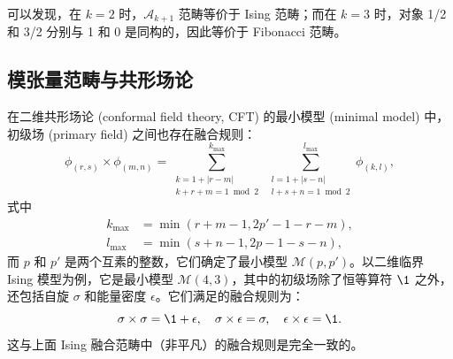 可以发现，在 $k=2$ 时，$\mathcal{A}_{k+1}$ 范畴等价于 Ising 范畴；而在 $k=3$ 时，对象 {1/2 和 3/2} 分别与 1 和 0 是同构的，因此等价于 Fibonacci 范畴。

\subsection{模张量范畴与共形场论}

在二维共形场论 (conformal field theory, CFT) 的最小模型 (minimal model) 中，初级场 (primary field) 之间也存在融合规则\cite{ginsparg1988applied,francesco2012conformal}：
\begin{equation}
  \phi_{(r,s)} \times \phi_{(m,n)}
  = \sum_{\substack{k=1+|r-m| \\ k+r+m=1 \bmod 2}}^{k_{\max}} \,
    \sum_{\substack{l=1+|s-n| \\ l+s+n=1 \bmod 2}}^{l_{\max}} \phi_{(k,l)},
\end{equation}
式中
\begin{equation}
  \begin{aligned}
    k_{\max} &= \min(r+m-1, 2p'-1-r-m), \\
    l_{\max} &= \min(s+n-1, 2p-1-s-n),
  \end{aligned}
\end{equation}
而 $p$ 和 $p'$ 是两个互素的整数，它们确定了最小模型 $\mathcal{M}(p,p')$。以二维临界 Ising 模型为例，它是最小模型 $\mathcal{M}(4,3)$，其中的初级场除了恒等算符 $\1$ 之外，还包括自旋 $\sigma$ 和能量密度 $\epsilon$。它们满足的融合规则为：
\begin{equation}
  \sigma\times\sigma = \1+\epsilon, \quad
  \sigma\times\epsilon = \sigma, \quad
  \epsilon\times\epsilon = \1.
\end{equation}
这与上面 Ising 融合范畴中（非平凡）的融合规则是完全一致的。

